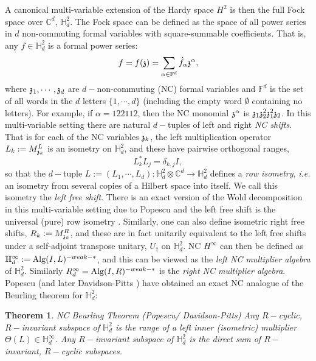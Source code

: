\documentclass[11pt]{article}
\newcommand{\mr}{\ensuremath{\mathrm}}
\newcommand{\mf}{\ensuremath{\mathfrak}}
\def\C{\mathbb{C}}
\def\bH{\mathbb{H}}
\def\hardy{\mathbb{H} ^2 _d}
\newcommand{\F}{\ensuremath{\mathbb{F} }}
\numberwithin{equation}{section}
\numberwithin{subsection}{section}
\newtheorem*{thm*}{Theorem}
\theoremstyle{definition}
\begin{document}
A canonical multi-variable extension of the Hardy space $H^2$ is then the full Fock space over $\C ^d$, $\hardy$.  The Fock space can be defined as the space of all power series in $d$ non-commuting formal variables with square-summable coefficients. That is, any $f \in \bH ^2 _d$ is a formal power series:
$$ f = f (\mf{z} ) = \sum _{\alpha \in \F ^d} \hat{f} _\alpha \mf{z} ^\alpha, $$ where $\mf{z} _1 , \cdots , \mf{z} _d$ are $d-$non-commuting (NC) formal variables and $\F ^d$ is the set of all words in the $d$ letters $\{ 1, \cdots , d \}$ (including the empty word $\emptyset$ containing no letters). For example, if $\alpha = 122112$, then the NC monomial $\mf{z} ^\alpha$ is $ \mf{z}_1 \mf{z} _2 ^2 \mf{z} _1 ^2 \mf{z} _2$. In this multi-variable setting there are natural $d-$tuples of left and right \emph{NC shifts}. That is for each of the NC variables $\mf{z} _k$, the left multiplication operator $L_k := M ^L _{\mf{z} _k}$ is an isometry on $\bH ^2 _d$, and these have pairwise orthogonal ranges, 
$$ L_k ^* L_j = \delta _{k,j} I, $$ so that the $d-$tuple $L := \left( L _1 , \cdots , L_d \right) : \bH ^2 _d \otimes \C ^d \rightarrow \bH ^2 _d$ defines a \emph{row isometry}, \emph{i.e.} an isometry from several copies of a Hilbert space into itself. We call this isometry the \emph{left free shift}.  There is an exact version of the Wold decomposition in this multi-variable setting due to Popescu and the left free shift is the universal (pure) row isometry \cite{Pop-dil}. Similarly, one can also define isometric right free shifts, $R_k := M^R _{\mf{z} _k}$, and these are in fact unitarily equivalent to the left free shifts under a self-adjoint transpose unitary, $U_\dag$ on $\bH ^2 _d$. NC $H^\infty$ can then be defined as $\bH ^\infty _d := \mr{Alg} (I , L) ^{-weak-*}$, and this can be viewed as the \emph{left NC multiplier algebra} of $\bH ^2 _d$. Similarly $R^\infty _d = \mr{Alg} (I, R) ^{-weak-*}$ is the \emph{right NC multiplier algebra}. Popescu \cite{Pop-charfun,Pop-multfact} (and later Davidson-Pitts \cite{DP-inv}) have obtained an exact NC analogue of the Beurling theorem for $\bH ^2 _d$: 

\begin{thm*}{ NC Beurling Theorem (Popescu/ Davidson-Pitts)}
Any $R-$cyclic, $R-$invariant subspace of $\bH ^2 _d$ is the range of a left inner (isometric) multiplier $\Theta (L) \in \bH ^\infty _d$. Any $R-$invariant subspace of $\bH ^2 _d$ is the direct sum of $R-$invariant, $R-$cyclic subspaces.
\end{thm*}
\end{document}
